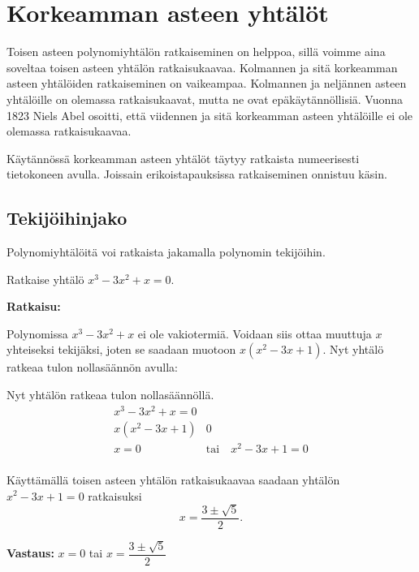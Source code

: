 \section{Korkeamman asteen yhtälöt}
Toisen asteen polynomiyhtälön ratkaiseminen on helppoa, sillä voimme aina soveltaa toisen asteen yhtälön ratkaisukaavaa.
Kolmannen ja sitä korkeamman asteen yhtälöiden ratkaiseminen on vaikeampaa.
Kolmannen ja neljännen asteen yhtälöille on olemassa ratkaisukaavat, mutta ne ovat epäkäytännöllisiä.
Vuonna 1823 Niels Abel osoitti, että viidennen ja sitä korkeamman asteen yhtälöille ei ole olemassa ratkaisukaavaa.

Käytännössä korkeamman asteen yhtälöt täytyy ratkaista numeerisesti tietokoneen avulla. Joissain erikoistapauksissa ratkaiseminen onnistuu käsin.


\subsection*{Tekijöihinjako}

Polynomiyhtälöitä voi ratkaista jakamalla polynomin tekijöihin.


\begin{esimerkki}
Ratkaise yhtälö $x^3 - 3x^2 + x = 0$.

\textbf{Ratkaisu:}

Polynomissa $x^3 - 3x^2 + x$ ei ole vakiotermiä. Voidaan siis ottaa muuttuja $x$ yhteiseksi tekijäksi, joten se saadaan muotoon $x(x^2 - 3x + 1)$. Nyt yhtälö ratkeaa tulon nollasäännön avulla:

Nyt yhtälön ratkeaa tulon nollasäännöllä.
\begin{align*}
x^3 - 3x^2 + x=0 \\
x(x^2 - 3x + 1)&0 \\
x= 0 \quad &\text{tai} \quad x^2 - 3x + 1 = 0 \\
\end{align*}

Käyttämällä toisen asteen yhtälön ratkaisukaavaa saadaan yhtälön $x^2 - 3x + 1 = 0$ ratkaisuksi
\[x = \frac{3\pm \sqrt{5}}{2}.\]

\textbf{Vastaus:}
$x= 0$ tai $x=\dfrac{3\pm \sqrt{5}}{2}$
\end{esimerkki}

